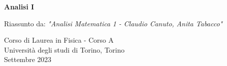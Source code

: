 \begin{titlepage}
	\begin{center}
		\vspace*{1cm}
		
		
		
		
		\textbf{\Huge Analisi I}
		
		\vspace{0.8cm}
		Riassunto da: \textit{"Analisi Matematica 1 - Claudio Canuto, Anita Tabacco"}
		
		
		
		\vfill
		
		
		
		\vfill
		\vspace{0.8cm}
		
		
		Corso di Laurea in Fisica - Corso A\\
		Università degli studi di Torino, Torino\\
		Settembre 2023\\
		
		
	\end{center}
\end{titlepage}
